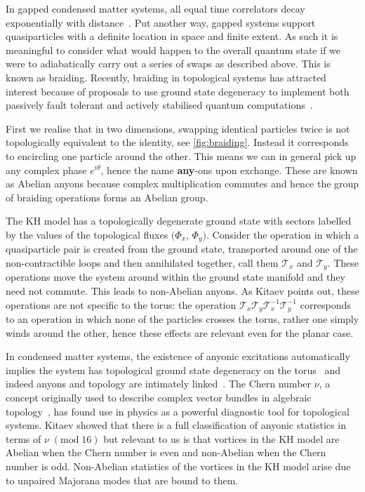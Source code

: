 In gapped condensed matter systems, all equal time correlators decay exponentially with distance~\autocite{hastingsLiebSchultzMattisHigherDimensions2004}. Put another way, gapped systems support quasiparticles with a definite location in space and finite extent. As such it is meaningful to consider what would happen to the overall quantum state if we were to adiabatically carry out a series of swaps as described above. This is known as braiding. Recently, braiding in topological systems has attracted interest because of proposals to use ground state degeneracy to implement both passively fault tolerant and actively stabilised quantum computations~\autocite{kitaev_fault-tolerant_2003,poulinStabilizerFormalismOperator2005,hastingsDynamicallyGeneratedLogical2021}.

First we realise that in two dimensions, swapping identical particles twice is not topologically equivalent to the identity, see \cref{fig:braiding}. Instead it corresponds to encircling one particle around the other. This means we can in general pick up any complex phase \(e^{i\theta}\), hence the name \textbf{any}-ons upon exchange. These are known as Abelian anyons because complex multiplication commutes and hence the group of braiding operations forms an Abelian group.

The KH model has a topologically degenerate ground state with sectors labelled by the values of the topological fluxes \((\Phi_x\), \(\Phi_y)\). Consider the operation in which a quasiparticle pair is created from the ground state, transported around one of the non-contractible loops and then annihilated together, call them \(\mathcal{T}_{x}\) and \(\mathcal{T}_{y}\). These operations move the system around within the ground state manifold and they need not commute. This leads to non-Abelian anyons. As Kitaev points out, these operations are not specific to the torus: the operation \(\mathcal{T}_{x}\mathcal{T}_{y}\mathcal{T}_{x}^{-1}\mathcal{T}_{y}^{-1}\) corresponds to an operation in which none of the particles crosses the torus, rather one simply winds around the other, hence these effects are relevant even for the planar case.

In condensed matter systems, the existence of anyonic excitations automatically implies the system has topological ground state degeneracy on the torus~\autocite{einarssonFractionalStatisticsTorus1990} and indeed anyons and topology are intimately linked~\autocite{oshikawaTopologicalDegeneracyNonAbelian2007,Chung_Topological_quantum2010,yaoAlgebraicSpinLiquid2009}. The Chern number \(\nu\), a concept originally used to describe complex vector bundles in algebraic topology~\autocite{chernCharacteristicClassesHermitian1946}, has found use in physics as a powerful diagnostic tool for topological systems. Kitaev showed that there is a full classification of anyonic statistics in terms of \(\nu\;(\mathrm{mod}\;16)\) but relevant to us is that vortices in the KH model are Abelian when the Chern number is even and non-Abelian when the Chern number is odd. Non-Abelian statistics of the vortices in the KH model arise due to unpaired Majorana modes that are bound to them.

